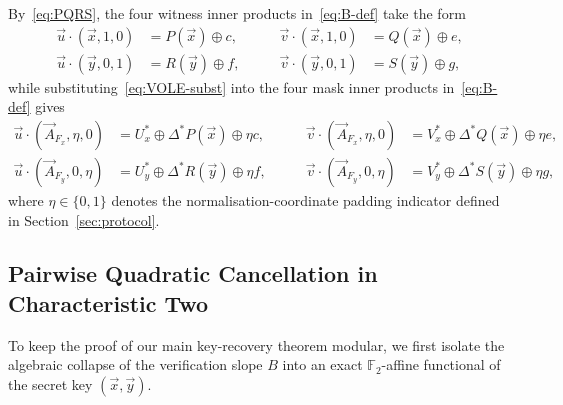 \documentclass[11pt,a4paper]{article}
\theoremstyle{definition}
\theoremstyle{remark}
\newcommand{\Ftwo}{\mathbb{F}_2}
\begin{document}
By~\eqref{eq:PQRS}, the four witness inner products in~\eqref{eq:B-def} take the form
\begin{equation}
\label{eq:xy-inner}
\begin{aligned}
\vec{u} \cdot (\vec{x}, 1, 0) &= P(\vec{x}) \oplus c, &\qquad
\vec{v} \cdot (\vec{x}, 1, 0) &= Q(\vec{x}) \oplus e, \\
\vec{u} \cdot (\vec{y}, 0, 1) &= R(\vec{y}) \oplus f, &\qquad
\vec{v} \cdot (\vec{y}, 0, 1) &= S(\vec{y}) \oplus g,
\end{aligned}
\end{equation}
while substituting~\eqref{eq:VOLE-subst} into the four mask inner products in~\eqref{eq:B-def} gives
\begin{equation}
\label{eq:AF-inner}
\begin{aligned}
\vec{u} \cdot (\vec{A}_{F_x}, \eta, 0) &= U_x^* \oplus \Delta^* P(\vec{x}) \oplus \eta c, &\qquad
\vec{v} \cdot (\vec{A}_{F_x}, \eta, 0) &= V_x^* \oplus \Delta^* Q(\vec{x}) \oplus \eta e, \\
\vec{u} \cdot (\vec{A}_{F_y}, 0, \eta) &= U_y^* \oplus \Delta^* R(\vec{y}) \oplus \eta f, &\qquad
\vec{v} \cdot (\vec{A}_{F_y}, 0, \eta) &= V_y^* \oplus \Delta^* S(\vec{y}) \oplus \eta g,
\end{aligned}
\end{equation}
where $\eta \in \{0, 1\}$ denotes the normalisation-coordinate padding indicator defined in Section~\ref{sec:protocol}.

\subsection{Pairwise Quadratic Cancellation in Characteristic Two}
To keep the proof of our main key-recovery theorem modular, we first isolate the algebraic collapse of the verification slope $B$ into an exact $\Ftwo$-affine functional of the secret key $(\vec{x}, \vec{y})$.
\end{document}
